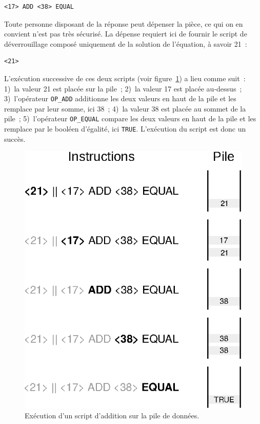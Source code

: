 \begin{Verbatim}[fontsize=\footnotesize]
<17> ADD <38> EQUAL
\end{Verbatim}

Toute personne disposant de la réponse peut dépenser la pièce, ce qui on en convient n'est pas très sécurisé. La dépense requiert ici de fournir le script de déverrouillage composé uniquement de la solution de l'équation, à savoir 21~:

\begin{Verbatim}[fontsize=\footnotesize]
<21>
\end{Verbatim}

L'exécution successive de ces deux scripts (voir figure~\ref{fig:bitcoin-stack}) a lieu comme suit~: 1)~la valeur 21 est placée sur la pile~; 2)~la valeur 17 est placée au-dessus~; 3)~l'opérateur \texttt{OP\_ADD} additionne les deux valeurs en haut de la pile et les remplace par leur somme, ici 38~; 4)~la valeur 38 est placée au sommet de la pile~; 5)~l'opérateur \texttt{OP\_EQUAL} compare les deux valeurs en haut de la pile et les remplace par le booléen d'égalité, ici \texttt{TRUE}. L'exécution du script est donc un succès.

\begin{figure}[ht]
  \centering
  \includegraphics[scale=0.75]{img/bitcoin-stack-example.eps}
  \caption{Exécution d'un script d'addition sur la pile de données.}
  \label{fig:bitcoin-stack}
\end{figure}

